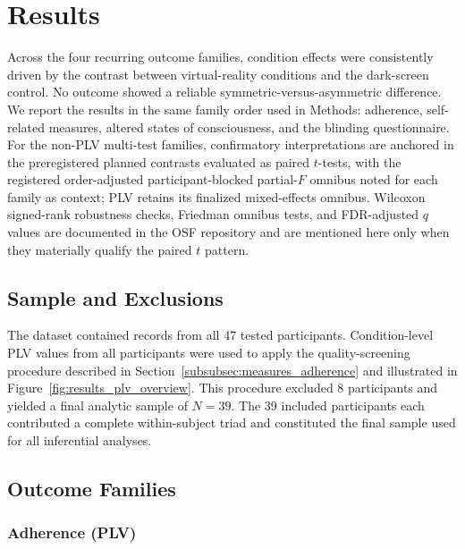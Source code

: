 \documentclass[pdflatex,sn-basic,lineno]{sn-jnl}
\begin{document}
\section{Results}\label{sec:results}

Across the four recurring outcome families, condition effects were consistently driven by the contrast between virtual-reality conditions and the dark-screen control. No outcome showed a reliable symmetric-versus-asymmetric difference. We report the results in the same family order used in Methods: adherence, self-related measures, altered states of consciousness, and the blinding questionnaire. For the non-PLV multi-test families, confirmatory interpretations are anchored in the preregistered planned contrasts evaluated as paired $t$-tests, with the registered order-adjusted participant-blocked partial-$F$ omnibus noted for each family as context; PLV retains its finalized mixed-effects omnibus. Wilcoxon signed-rank robustness checks, Friedman omnibus tests, and FDR-adjusted $q$ values are documented in the OSF repository and are mentioned here only when they materially qualify the paired $t$ pattern.

\subsection{Sample and Exclusions}\label{subsec:results_sample}

The dataset contained records from all 47 tested participants. Condition-level PLV values from all participants were used to apply the quality-screening procedure described in Section~\ref{subsubsec:measures_adherence} and illustrated in Figure~\ref{fig:results_plv_overview}. This procedure excluded 8 participants and yielded a final analytic sample of $N = 39$. The 39 included participants each contributed a complete within-subject triad and constituted the final sample used for all inferential analyses.

\subsection{Outcome Families}\label{subsec:results_families}

\subsubsection{Adherence (PLV)}\label{subsubsec:results_plv}
\end{document}
